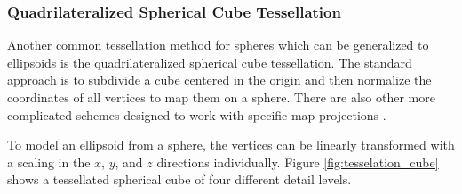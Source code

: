 \subsubsection{Quadrilateralized Spherical Cube Tessellation}
 
Another common tessellation method for spheres which can be generalized to ellipsoids is the quadrilateralized spherical cube tessellation. The standard approach is to subdivide a cube centered in the origin and then normalize the coordinates of all vertices to map them on a sphere. There are also other more complicated schemes designed to work with specific map projections \cite{dimi15}.

To model an ellipsoid from a sphere, the vertices can be linearly transformed with a scaling in the $x$, $y$, and $z$ directions individually. Figure \ref{fig:tesselation_cube} shows a tessellated spherical cube of four different detail levels.

